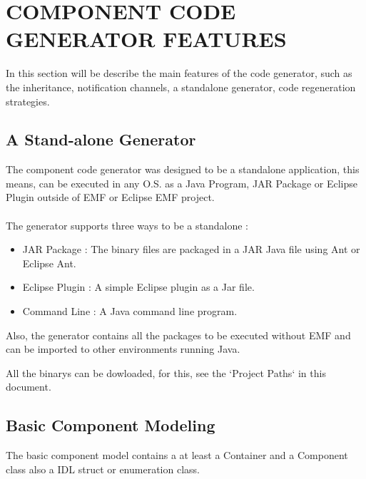 \section{COMPONENT CODE GENERATOR FEATURES}

In this section will be describe the main features of the code generator, such
as the inheritance, notification channels, a standalone generator, code
regeneration strategies.

\subsection{A Stand-alone Generator}
The component code generator was designed to be a standalone application,
this means, can be executed in any O.S. as a Java Program, JAR Package or
Eclipse Plugin outside of EMF or Eclipse EMF project.\\
\\
The generator supports three ways to be a standalone :
\begin{itemize}
  \item JAR Package : The binary files are packaged in a JAR Java file using
  Ant or Eclipse Ant.
  \item Eclipse Plugin : A simple Eclipse plugin as a Jar file.
  \item Command Line : A Java command line program.
\end{itemize}
Also, the generator contains all the packages to be executed without EMF and 
can be imported to other environments running Java.

All the binarys can be dowloaded, for this, see the `Project Paths` in this
document.

\subsection{Basic Component Modeling}

The basic component model contains a at least a Container and a Component
class also a IDL struct or enumeration class.

